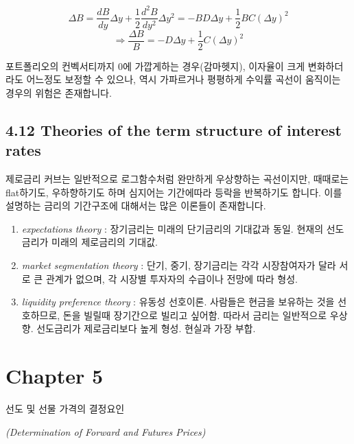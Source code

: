 \documentclass[
  letterpaper,
  DIV=11,
  numbers=noendperiod]{scrreprt}
\providecommand{\tightlist}{%
  \setlength{\itemsep}{0pt}\setlength{\parskip}{0pt}}\usepackage{longtable,booktabs,array}
\begin{document}
\[\Delta B=\frac{dB}{dy}\Delta y+\frac{1}{2}\frac{d^2B}{dy^2}\Delta y^2=-BD\Delta y+\frac{1}{2}BC(\Delta y)^2\]
\[\Rightarrow\frac{\Delta B}{B}=-D\Delta y+\frac{1}{2}C(\Delta y)^2\]

포트폴리오의 컨벡서티까지 0에 가깝게하는 경우(감마헷지), 이자율이 크게
변화하더라도 어느정도 보정할 수 있으나, 역시 가파르거나 평평하게 수익률
곡선이 움직이는 경우의 위험은 존재합니다.

\section*{4.12 Theories of the term structure of interest
rates}\label{theories-of-the-term-structure-of-interest-rates}


제로금리 커브는 일반적으로 로그함수처럼 완만하게 우상향하는 곡선이지만,
때때로는 flat하기도, 우하향하기도 하며 심지어는 기간에따라 등락을
반복하기도 합니다. 이를 설명하는 금리의 기간구조에 대해서는 많은
이론들이 존재합니다.

\begin{enumerate}
\def\labelenumi{\arabic{enumi}.}
\tightlist
\item
  \emph{expectations theory} : 장기금리는 미래의 단기금리의 기대값과
  동일. 현재의 선도금리가 미래의 제로금리의 기대값.
\item
  \emph{market segmentation theory} : 단기, 중기, 장기금리는 각각
  시장참여자가 달라 서로 큰 관계가 없으며, 각 시장별 투자자의 수급이나
  전망에 따라 형성.
\item
  \emph{liquidity preference theory} : 유동성 선호이론. 사람들은 현금을
  보유하는 것을 선호하므로, 돈을 빌릴때 장기간으로 빌리고 싶어함. 따라서
  금리는 일반적으로 우상향. 선도금리가 제로금리보다 높게 형성. 현실과
  가장 부합.
\end{enumerate}


\chapter*{Chapter 5}\label{chapter-5}


선도 및 선물 가격의 결정요인

\emph{(Determination of Forward and Futures Prices)}
\end{document}
